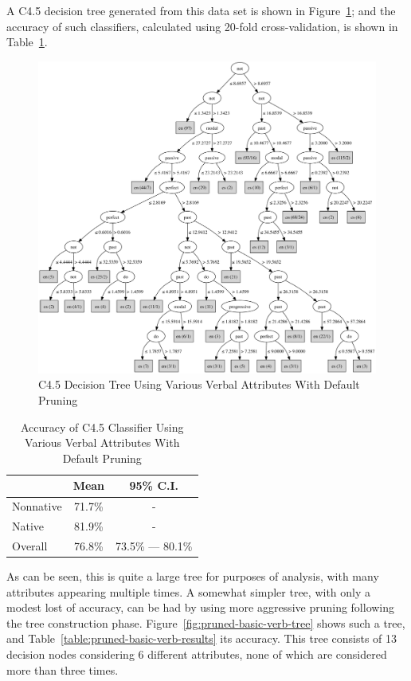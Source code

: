 \documentclass[main.tex]{subfiles}
\begin{document}
A C4.5 decision tree generated from this data set is shown in Figure~\ref{fig:normally-pruned-basic-verb-tree}; and the accuracy of such classifiers, calculated using 20-fold cross-validation, is shown in Table~\ref{table:normally-pruned-basic-verb-results}.
\begin{figure}[htbp]
\centering
\includegraphics[width=6in]{unpruned-basic-verb-tree.pdf}
\caption{C4.5 Decision Tree Using Various Verbal Attributes With Default Pruning}
\label{fig:normally-pruned-basic-verb-tree}
\end{figure}
\begin{table}[htbp]
\centering
\caption{Accuracy of C4.5 Classifier Using Various Verbal Attributes With Default Pruning}
\begin{tabular}{l c c}
\toprule
& Mean & 95\% C.I.\\
\midrule
Nonnative & 71.7\% & - \\
Native & 81.9\% & - \\
Overall & 76.8\% & 73.5\% --- 80.1\% \\
\bottomrule
\end{tabular}
\label{table:normally-pruned-basic-verb-results}
\end{table}
As can be seen, this is quite a large tree for purposes of analysis, with many attributes appearing multiple times. A somewhat simpler tree, with only a modest lost of accuracy, can be had by using more aggressive pruning following the tree construction phase. Figure~\ref{fig:pruned-basic-verb-tree} shows such a tree, and Table~\ref{table:pruned-basic-verb-results} its accuracy. This tree consists of 13 decision nodes considering 6 different attributes, none of which are considered more than three times.
\end{document}
